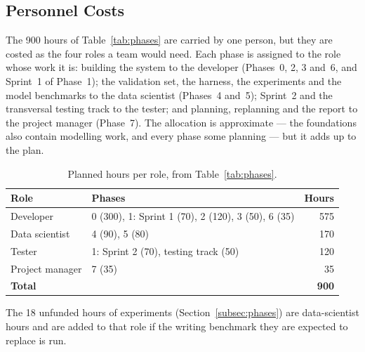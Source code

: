 
\subsection{Personnel Costs}
\label{subsec:personnel-costs}

The 900 hours of Table~\ref{tab:phases} are carried by one person, but
they are costed as the four roles a team would need. Each phase is
assigned to the role whose work it is: building the system to the
developer (Phases~0, 2, 3 and~6, and Sprint~1 of Phase~1); the
validation set, the harness, the experiments and the model benchmarks
to the data scientist (Phases~4 and~5); Sprint~2 and the transversal
testing track to the tester; and planning, replanning and the report to
the project manager (Phase~7). The allocation is approximate --- the
foundations also contain modelling work, and every phase some planning
--- but it adds up to the plan.

\begin{table}[ht]
\centering
\small
\caption{Planned hours per role, from Table~\ref{tab:phases}.}
\label{tab:personnel-hours}
\begin{tabular}{@{}llr@{}}
\toprule
Role & Phases & Hours \\
\midrule
Developer       & 0 (300), 1: Sprint 1 (70), 2 (120), 3 (50), 6 (35) & 575 \\
Data scientist  & 4 (90), 5 (80)                                      & 170 \\
Tester          & 1: Sprint 2 (70), testing track (50)                & 120 \\
Project manager & 7 (35)                                              &  35 \\
\midrule
\textbf{Total}  &                                                     & \textbf{900} \\
\bottomrule
\end{tabular}
\end{table}

The 18 unfunded hours of experiments (Section~\ref{subsec:phases}) are
data-scientist hours and are added to that role if the writing
benchmark they are expected to replace is run.

